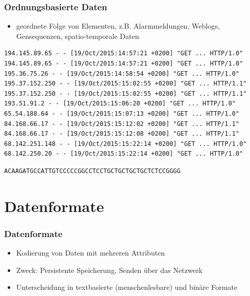 
\begin{frame}[fragile]
\frametitle{Ordnungsbasierte Daten}

\begin{itemize}
\item geordnete Folge von Elementen, z.B. Alarmmeldungen, Weblogs, Gensequenzen, spatio-temporale Daten
\end{itemize}

{\scriptsize
\begin{verbatim}
194.145.89.65 - - [19/Oct/2015:14:57:21 +0200] "GET ... HTTP/1.0"
194.145.89.65 - - [19/Oct/2015:14:57:21 +0200] "GET ... HTTP/1.0"
195.36.75.26 - - [19/Oct/2015:14:58:54 +0200] "GET ... HTTP/1.0"
195.37.152.250 - - [19/Oct/2015:15:02:55 +0200] "GET ... HTTP/1.1"
195.37.152.250 - - [19/Oct/2015:15:02:55 +0200] "GET ... HTTP/1.1"
193.51.91.2 - - [19/Oct/2015:15:06:20 +0200] "GET ... HTTP/1.0"
65.54.188.64 - - [19/Oct/2015:15:07:13 +0200] "GET ... HTTP/1.0"
84.168.66.17 - - [19/Oct/2015:15:12:02 +0200] "GET ... HTTP/1.1"
84.168.66.17 - - [19/Oct/2015:15:12:08 +0200] "GET ... HTTP/1.1"
68.142.251.148 - - [19/Oct/2015:15:22:14 +0200] "GET ... HTTP/1.0"
68.142.250.20 - - [19/Oct/2015:15:22:14 +0200] "GET ... HTTP/1.0"
\end{verbatim}
}

{%
\begin{verbatim}
ACAAGATGCCATTGTCCCCCGGCCTCCTGCTGCTGCTGCTCTCCGGGG
\end{verbatim}
}

\end{frame}


\section{Datenformate}

\begin{frame}
\frametitle{Datenformate}

\begin{itemize}
\item Kodierung von Daten mit mehreren Attributen
\item Zweck: Persistente Speicherung, Senden über das Netzwerk
\item Unterscheidung in textbasierte (menschenlesbare) und binäre Formate
\end{itemize}

\end{frame}

